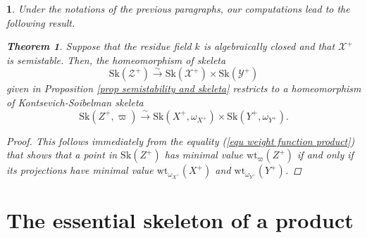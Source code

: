 \documentclass{amsart}%
\numberwithin{equation}{subsection}
\theoremstyle{plain2}
\newtheorem{thm}[equation]{Theorem}
\newtheorem{cor}[equation]{Corollary}
\theoremstyle{definition2}
\theoremstyle{stepstyle}
\theoremstyle{point}
\theoremstyle{subpoint}
\newtheorem{subpoint}[equation]{}%
\newcommand{\spa}[1]{\begin{subpoint}#1\end{subpoint}}           %
\newcommand{\cX}{\ensuremath{\mathscr{X}}}
\newcommand{\cY}{\ensuremath{\mathscr{Y}}}
\newcommand{\cZ}{\ensuremath{\mathscr{Z}}}
\renewcommand{\cZ}{\ensuremath{\mathscr{Z}}}
\renewcommand{\cY}{\ensuremath{\mathscr{Y}}}
\newcommand{\weight}{\mathrm{wt}}
\newcommand{\Sk}{\mathrm{Sk}}
\begin{document}
\spa{Under the notations of the previous paragraphs, our computations lead to the following result.
\begin{thm}  \label{thm semistability and KS skeleta}
Suppose that the residue field $k$ is algebraically closed and that $\cX^+$ is semistable. Then, the homeomorphism of skeleta $$\Sk(\cZ^+) \xrightarrow{\sim} \Sk(\cX^+) \times \Sk(\cY^+)$$ given in Proposition \ref{prop semistability and skeleta} restricts to a homeomorphism of Kontsevich-Soibelman skeleta $$\Sk(Z^+, \varpi) \xrightarrow{\sim} \Sk(X^+, \omega_{X^+}) \times \Sk(Y^+, \omega_{Y^+}).$$ 
\end{thm}
\begin{proof}
This follows immediately from the equality (\ref{equ weight function product}) that shows that a point in $\Sk(Z^+)$ has minimal value $\weight_{\varpi}(Z^+)$ if and only if its projections have minimal value $\weight_{\omega_{X^+}}(X^+)$ and $\weight_{\omega_{Y^+}}(Y^+)$.
\end{proof}
}

\section{The essential skeleton of a product}
%
%
\end{document}
